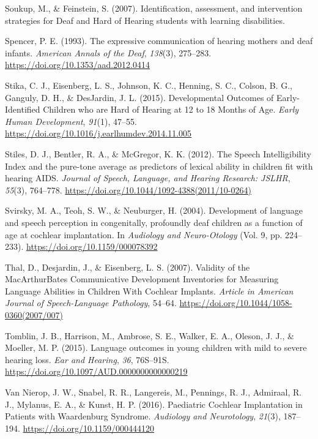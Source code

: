 \documentclass[english,man]{apa6}
\begin{document}
\leavevmode\hypertarget{ref-soukup2007}{}%
Soukup, M., \& Feinstein, S. (2007). Identification, assessment, and intervention strategies for Deaf and Hard of Hearing students with learning disabilities.

\leavevmode\hypertarget{ref-spencer1993}{}%
Spencer, P. E. (1993). The expressive communication of hearing mothers and deaf infants. \emph{American Annals of the Deaf}, \emph{138}(3), 275--283. \url{https://doi.org/10.1353/aad.2012.0414}

\leavevmode\hypertarget{ref-stika2015}{}%
Stika, C. J., Eisenberg, L. S., Johnson, K. C., Henning, S. C., Colson, B. G., Ganguly, D. H., \& DesJardin, J. L. (2015). Developmental Outcomes of Early-Identified Children who are Hard of Hearing at 12 to 18 Months of Age. \emph{Early Human Development}, \emph{91}(1), 47--55. \url{https://doi.org/10.1016/j.earlhumdev.2014.11.005}

\leavevmode\hypertarget{ref-stiles2012}{}%
Stiles, D. J., Bentler, R. A., \& McGregor, K. K. (2012). The Speech Intelligibility Index and the pure-tone average as predictors of lexical ability in children fit with hearing AIDS. \emph{Journal of Speech, Language, and Hearing Research: JSLHR}, \emph{55}(3), 764--778. \url{https://doi.org/10.1044/1092-4388(2011/10-0264)}

\leavevmode\hypertarget{ref-svirsky2004}{}%
Svirsky, M. A., Teoh, S. W., \& Neuburger, H. (2004). Development of language and speech perception in congenitally, profoundly deaf children as a function of age at cochlear implantation. In \emph{Audiology and Neuro-Otology} (Vol. 9, pp. 224--233). \url{https://doi.org/10.1159/000078392}

\leavevmode\hypertarget{ref-thal2007}{}%
Thal, D., Desjardin, J., \& Eisenberg, L. S. (2007). Validity of the MacArthurBates Communicative Development Inventories for Measuring Language Abilities in Children With Cochlear Implants. \emph{Article in American Journal of Speech-Language Pathology}, 54--64. \url{https://doi.org/10.1044/1058-0360(2007/007)}

\leavevmode\hypertarget{ref-tomblin2015}{}%
Tomblin, J. B., Harrison, M., Ambrose, S. E., Walker, E. A., Oleson, J. J., \& Moeller, M. P. (2015). Language outcomes in young children with mild to severe hearing loss. \emph{Ear and Hearing}, \emph{36}, 76S--91S. \url{https://doi.org/10.1097/AUD.0000000000000219}

\leavevmode\hypertarget{ref-vannierop2016}{}%
Van Nierop, J. W., Snabel, R. R., Langereis, M., Pennings, R. J., Admiraal, R. J., Mylanus, E. A., \& Kunst, H. P. (2016). Paediatric Cochlear Implantation in Patients with Waardenburg Syndrome. \emph{Audiology and Neurotology}, \emph{21}(3), 187--194. \url{https://doi.org/10.1159/000444120}
\end{document}
